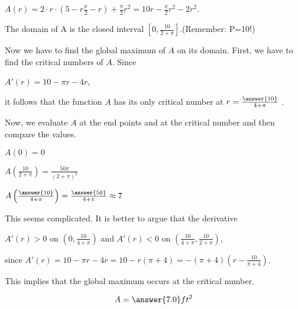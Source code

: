 \documentclass{ximera}
\begin{document}
\begin{exercise}
\begin{hint}
           $A(r)=2\cdot r\cdot (5-r\frac{\pi}{2}-r)+\frac{\pi}{2} r^2=10r-\frac{\pi}{2}r^2-2r^2$.
           
           The domain of A is  the closed interval $\left[0,\frac{10}{2+\pi}\right]$.(Remember: P=10!)
              \end{hint}
                \begin{hint}
                Now we have to find the global maximum of $A$ on its domain.
                First, we have to find the critical numbers of $A$.
                Since
                
                $A'(r)=10-\pi r-4r$,
                
                it follows that the function $A$ has its only critical number at  $r=\frac{\answer{10}}{4+\pi}$ .
                              \end{hint}
                                \begin{hint}
                                Now, we evaluate $A$ at the end points and at the critical number and then compare the values.
                                
                                $A(0)=0$
                                
                                $A\left(\frac{10}{2+\pi}\right)=\frac{50\pi}{(2+\pi)^2}$
                                
                                $A\left(\frac{\answer{10}}{4+\pi}\right)=\frac{\answer{50}}{4+\pi}\approx 7$
                                
                                This seems complicated. It is better to argue that the derivative 
                                
                                $A'(r)>0$ on $\left(0,\frac{10}{4+\pi}\right)$ and  $A'(r)<0$ on $\left(\frac{10}{4+\pi},\frac{10}{2+\pi}\right)$,
                                
                                 since $A'(r)=10-\pi r-4r=10-r(\pi+4)=-(\pi+4)\left(r-\frac{10}{\pi+4}\right)$.
                                 
                                 
                                 This implies that the global maximum occurs at the critical number.

                                  \end{hint}
  \begin{prompt}
  \[
  A = \answer{7.0} ft^2
  \]
  \end{prompt}
\end{exercise}
\end{document}
